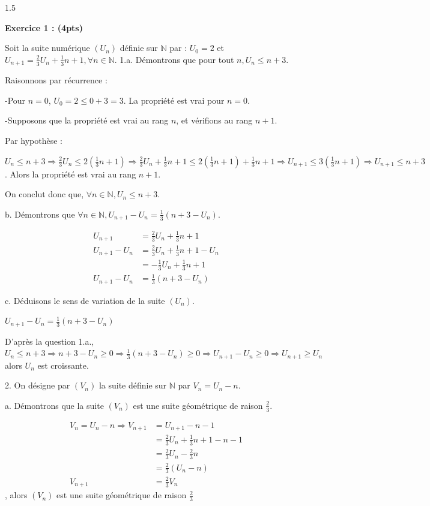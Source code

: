 \documentclass[12pt]{article}
\begin{document}
\begin{spacing}{1.5}

\textbf{Exercice 1 : (4pts)}

Soit la suite numérique $(U_n)$ définie sur $\mathbb{N}$ par : $U_0 = 2$ et $U_{n+1} = \frac{2}{3}U_n + \frac{1}{3}n + 1, \forall {n\in \mathbb{N}}$.
1.a. Démontrons que pour tout $n, U_n\leq n+3$.

Raisonnons par récurrence :

-Pour $n=0$, $U_0=2\leq 0+3=3$. La propriété est vrai pour $n=0$.

-Supposons que la propriété est vrai au rang $n$, et vérifions au rang $n+1$.

Par hypothèse :

$U_n\leq n+3\Rightarrow \frac{2}{3}U_n\leq 2(\frac{1}{3}n+1)\Rightarrow \frac{2}{3}U_n+\frac{1}{3}n + 1\leq 2(\frac{1}{3}n+1)+\frac{1}{3}n + 1\Rightarrow U_{n+1}\leq 3(\frac{1}{3}n + 1)\Rightarrow U_{n+1}\leq n+3$. Alors la propriété est vrai au rang $n+1$.

On conclut donc que, $\forall n\in \mathbb{N}, U_n\leq n+3$.


b. Démontrons que $\forall {n\in \mathbb{N}}, U_{n+1} - U_n = \frac{1}{3}(n+3-U_n)$.

\begin{align*}
U_{n+1} &= \frac{2}{3}U_n + \frac{1}{3}n + 1\\
U_{n+1}-U_n &= \frac{2}{3}U_n + \frac{1}{3}n + 1-U_n\\
&=-\frac{1}{3}U_n+\frac{1}{3}n + 1\\
U_{n+1}-U_n &=\frac{1}{3}(n + 3-U_n)
\end{align*}

c. Déduisons le sens de variation de la suite $(U_n)$.

$U_{n+1}-U_n =\frac{1}{3}(n + 3-U_n)$

D'après la question 1.a., $U_n\leq n+3\Rightarrow n + 3-U_n\geq 0 \Rightarrow \frac{1}{3}(n + 3-U_n)\geq 0\Rightarrow U_{n+1}-U_n \geq 0\Rightarrow U_{n+1}\geq U_n$ alors $U_n$ est croissante.

2. On désigne par $(V_n)$ la suite définie sur $\mathbb{N}$ par $V_n =U_n-n$.

a. Démontrons que la suite $(V_n)$ est une suite géométrique de raison $\frac{2}{3}$.

\begin{align*}
V_n =U_n-n\Rightarrow V_{n+1} &=U_{n+1}-n-1\\
&=\frac{2}{3}U_n + \frac{1}{3}n + 1-n-1\\
&=\frac{2}{3}U_n - \frac{2}{3}n\\
&=\frac{2}{3}(U_n-n)\\
V_{n+1} &=\frac{2}{3}V_n
\end{align*}, alors $(V_n)$ est une suite géométrique de raison $\frac{2}{3}$



\end{spacing}
\end{document}
